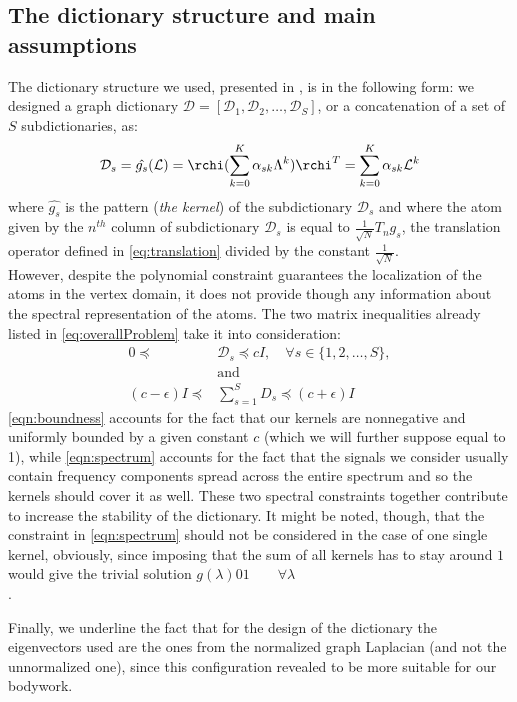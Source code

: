 \subsection{The dictionary structure and main assumptions}
The dictionary structure we used, presented in \cite{Thanou2014}, is in the following form: we designed a graph dictionary $\mathcal{D} = [\mathcal{D}_1, \mathcal{D}_2,\dots,\mathcal{D}_S]$, or a concatenation of a set of $S$ subdictionaries, as:
\begin{equation}
  \mathcal{D}_s = \hat{g_s}(\mathcal{L}) = \rchi (\sum_{k=0}^K \alpha_{sk}\Lambda^k)\rchi^T =   \sum_{k=0}^{K} \alpha_{sk}\mathcal{L}^k
\end{equation}
where $\hat{g_s}$ is the pattern (\textit{the kernel}) of the subdictionary $\mathcal{D}_s$ and where the atom given by the $n^{th}$ column of subdictionary $\mathcal{D}_s$ is equal to $\frac{1}{\sqrt{N}}T_ng_s$, the translation operator defined in \autoref{eq:translation} divided by the constant $\frac{1}{\sqrt{N}}$.\\
However, despite the polynomial constraint guarantees the localization of the atoms in the vertex domain, it does not provide though any information about the spectral representation of the atoms. The two matrix inequalities already listed in \ref{eq:overallProblem} take it into consideration:
\begin{align}
  0 \preceq \text{ } &\mathcal{D}_s \preceq cI, \quad \forall s \in \{1,2,\dots , S\},  \label{eqn:boundness}\\
  &\text{and}\\
  (c-\epsilon)I \preceq &\sum_{s=1}^{S}D_s \preceq (c+\epsilon)I \label{eqn:spectrum}
\end{align}
\autoref{eqn:boundness} accounts for the fact that our kernels are nonnegative and uniformly bounded by a given constant $c$ (which we will further suppose equal to 1), while \autoref{eqn:spectrum} accounts for the fact that the signals we consider usually contain frequency components spread across the entire spectrum and so the kernels should cover it as well. These two spectral constraints together contribute to increase the stability of the dictionary. It might be noted, though, that the constraint in \autoref{eqn:spectrum}  should not be considered in the case of one single kernel, obviously, since imposing that the sum of all kernels has to stay around $1$ would give the trivial solution $g(\lambda) 0 1 \qquad \forall \lambda$\\.

Finally, we underline the fact that for the design of the dictionary the eigenvectors used are the ones from the normalized graph Laplacian (and not the unnormalized one), since this configuration revealed to be more suitable for our bodywork.

